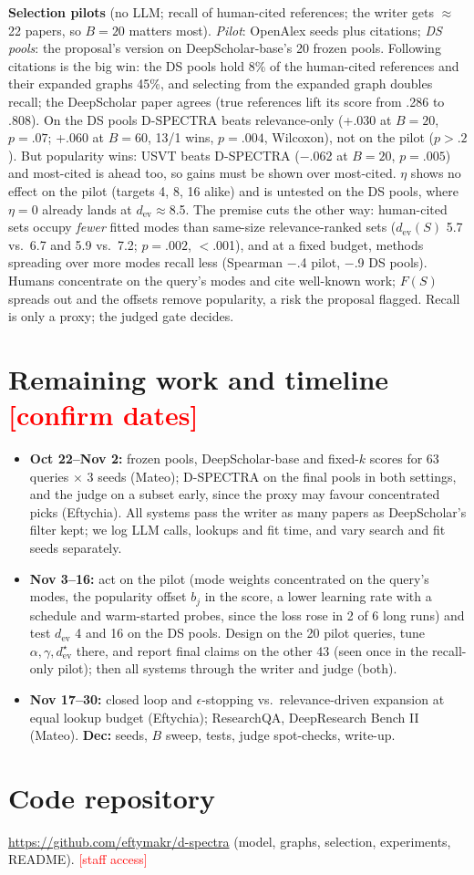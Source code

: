 \documentclass[10pt]{article}
\newcommand{\todo}[1]{\textcolor{red}{[#1]}}
\begin{document}
\textbf{Selection pilots} (no LLM; recall of human-cited references; the writer gets $\approx$22 papers, so $B{=}20$ matters most). \emph{Pilot}: OpenAlex seeds plus citations; \emph{DS pools}: the proposal's version on DeepScholar-base's 20 frozen pools. Following citations is the big win: the DS pools hold 8\% of the human-cited references and their expanded graphs 45\%, and selecting from the expanded graph doubles recall; the DeepScholar paper agrees (true references lift its score from .286 to .808). On the DS pools D-SPECTRA beats relevance-only (+.030 at $B{=}20$, $p{=}.07$; +.060 at $B{=}60$, 13/1 wins, $p{=}.004$, Wilcoxon), not on the pilot ($p>.2$). But popularity wins: USVT beats D-SPECTRA ($-$.062 at $B{=}20$, $p{=}.005$) and most-cited is ahead too, so gains must be shown over most-cited. $\eta$ shows no effect on the pilot (targets 4, 8, 16 alike) and is untested on the DS pools, where $\eta{=}0$ already lands at $d_{\mathrm{ev}}\approx$8.5. The premise cuts the other way: human-cited sets occupy \emph{fewer} fitted modes than same-size relevance-ranked sets ($d_{\mathrm{ev}}(S)$ 5.7 vs.\ 6.7 and 5.9 vs.\ 7.2; $p{=}.002$, $<$.001), and at a fixed budget, methods spreading over more modes recall less (Spearman $-$.4 pilot, $-$.9 DS pools). Humans concentrate on the query's modes and cite well-known work; $F(S)$ spreads out and the offsets remove popularity, a risk the proposal flagged. Recall is only a proxy; the judged gate decides.

\section{Remaining work and timeline \textmd{\todo{confirm dates}}}
\begin{itemize}
\item \textbf{Oct 22--Nov 2:} frozen pools, DeepScholar-base and fixed-$k$ scores for 63 queries $\times$ 3 seeds (Mateo); D-SPECTRA on the final pools in both settings, and the judge on a subset early, since the proxy may favour concentrated picks (Eftychia). All systems pass the writer as many papers as DeepScholar's filter kept; we log LLM calls, lookups and fit time, and vary search and fit seeds separately.
\item \textbf{Nov 3--16:} act on the pilot (mode weights concentrated on the query's modes, the popularity offset $b_j$ in the score, a lower learning rate with a schedule and warm-started probes, since the loss rose in 2 of 6 long runs) and test $d_{\mathrm{ev}}$ 4 and 16 on the DS pools. Design on the 20 pilot queries, tune $\alpha,\gamma,d_{\mathrm{ev}}^\star$ there, and report final claims on the other 43 (seen once in the recall-only pilot); then all systems through the writer and judge (both).
\item \textbf{Nov 17--30:} closed loop and $\epsilon$-stopping vs.\ relevance-driven expansion at equal lookup budget (Eftychia); ResearchQA, DeepResearch Bench II (Mateo). \textbf{Dec:} seeds, $B$ sweep, tests, judge spot-checks, write-up.
\end{itemize}

\section{Code repository}
\url{https://github.com/eftymakr/d-spectra} (model, graphs, selection, experiments, README). \todo{staff access}
\end{document}
